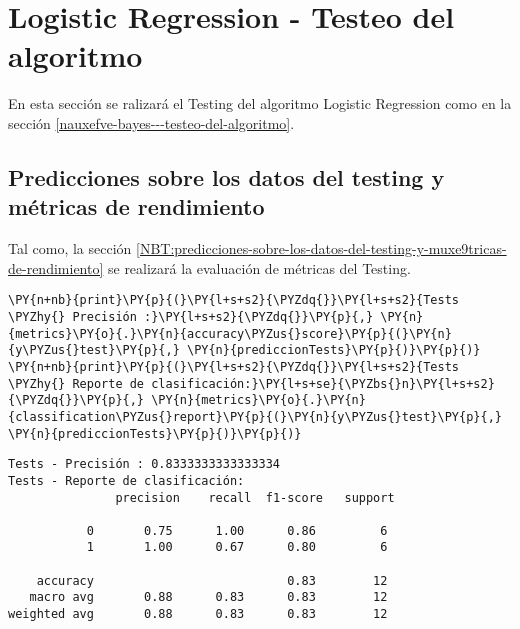     \hypertarget{logistic-regression---testeo-del-algoritmo}{%
\section{Logistic Regression - Testeo del algoritmo}\label{logistic-regression---testeo-del-algoritmo}}

	En esta sección se ralizará el Testing del algoritmo Logistic Regression como en la sección \ref{nauxefve-bayes---testeo-del-algoritmo}.

    \hypertarget{predicciones-sobre-los-datos-del-testing-y-muxe9tricas-de-rendimiento}{%
\subsection{Predicciones sobre los datos del testing y métricas de rendimiento}\label{predicciones-sobre-los-datos-del-testing-y-muxe9tricas-de-rendimiento}}

	Tal como, la sección \ref{NBT:predicciones-sobre-los-datos-del-testing-y-muxe9tricas-de-rendimiento} se realizará la evaluación de métricas del Testing.

    \begin{tcolorbox}[breakable, size=fbox, boxrule=1pt, pad at break*=1mm,colback=cellbackground, colframe=cellborder]
\begin{Verbatim}[commandchars=\\\{\}]
\PY{n+nb}{print}\PY{p}{(}\PY{l+s+s2}{\PYZdq{}}\PY{l+s+s2}{Tests \PYZhy{} Precisión :}\PY{l+s+s2}{\PYZdq{}}\PY{p}{,} \PY{n}{metrics}\PY{o}{.}\PY{n}{accuracy\PYZus{}score}\PY{p}{(}\PY{n}{y\PYZus{}test}\PY{p}{,} \PY{n}{prediccionTests}\PY{p}{)}\PY{p}{)}
\PY{n+nb}{print}\PY{p}{(}\PY{l+s+s2}{\PYZdq{}}\PY{l+s+s2}{Tests \PYZhy{} Reporte de clasificación:}\PY{l+s+se}{\PYZbs{}n}\PY{l+s+s2}{\PYZdq{}}\PY{p}{,} \PY{n}{metrics}\PY{o}{.}\PY{n}{classification\PYZus{}report}\PY{p}{(}\PY{n}{y\PYZus{}test}\PY{p}{,} \PY{n}{prediccionTests}\PY{p}{)}\PY{p}{)}
\end{Verbatim}
\end{tcolorbox}

    \begin{Verbatim}[commandchars=\\\{\}]
Tests - Precisión : 0.8333333333333334
Tests - Reporte de clasificación:
               precision    recall  f1-score   support

           0       0.75      1.00      0.86         6
           1       1.00      0.67      0.80         6

    accuracy                           0.83        12
   macro avg       0.88      0.83      0.83        12
weighted avg       0.88      0.83      0.83        12

    \end{Verbatim}
    
